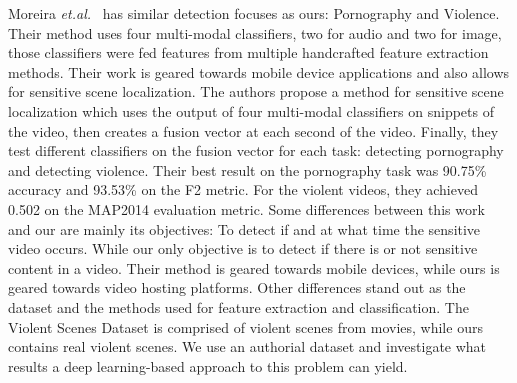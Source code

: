 Moreira \textit{et.al.}~\cite{moreira2019multimodal} has similar detection focuses as ours: Pornography and Violence. 
Their method uses four multi-modal classifiers, two for audio and two for image, those classifiers were fed features from multiple handcrafted feature extraction methods. Their work is geared towards mobile device applications and also allows for sensitive scene localization.
The authors propose a method for sensitive scene localization which uses the output of four multi-modal classifiers on snippets of the video, then creates a fusion vector at each second of the video. 
Finally, they test different classifiers on the fusion vector for each task: detecting pornography and detecting violence. Their best result on the pornography task was 90.75\% accuracy and 93.53\% on the F2 metric. For the violent videos, they achieved 0.502 on the MAP2014 evaluation metric.
Some differences between this work and our are mainly its objectives: To detect if and at what time the sensitive video occurs. While our only objective is to detect if there is or not sensitive content in a video. Their method is geared towards mobile devices, while ours is geared towards video hosting platforms.
Other differences stand out as the dataset and the methods used for feature extraction and classification. 
The Violent Scenes Dataset \cite{VSD2014} is comprised of violent scenes from movies, while ours contains real violent scenes.
We use an authorial dataset and investigate what results a deep learning-based approach to this problem can yield.



